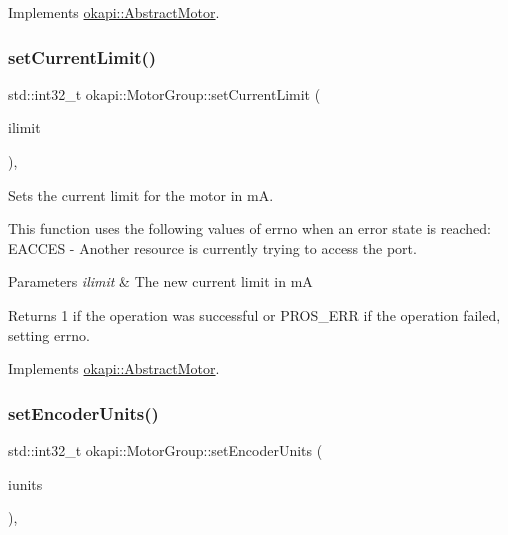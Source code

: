 Implements \mbox{\hyperlink{classokapi_1_1AbstractMotor_af7bb7d0d895c89d6b193f500587a818b}{okapi\+::\+Abstract\+Motor}}.

\mbox{\label{classokapi_1_1MotorGroup_a6d70691246bb8ba18d17f97b40a7f3f9}} 
\subsubsection{\texorpdfstring{setCurrentLimit()}{setCurrentLimit()}}
{\footnotesize\ttfamily std\+::int32\+\_\+t okapi\+::\+Motor\+Group\+::set\+Current\+Limit (\begin{DoxyParamCaption}\item[{std\+::int32\+\_\+t}]{ilimit }\end{DoxyParamCaption})\hspace{0.3cm}{\ttfamily [override]}, {\ttfamily [virtual]}}

Sets the current limit for the motor in mA.

This function uses the following values of errno when an error state is reached\+: E\+A\+C\+C\+ES -\/ Another resource is currently trying to access the port.


\begin{DoxyParams}{Parameters}
{\em ilimit} & The new current limit in mA \\
\hline
\end{DoxyParams}
\begin{DoxyReturn}{Returns}
1 if the operation was successful or {\ttfamily P\+R\+O\+S\+\_\+\+E\+RR} if the operation failed, setting errno. 
\end{DoxyReturn}


Implements \mbox{\hyperlink{classokapi_1_1AbstractMotor_aec97c81f3d6604363ebc8ceaf425fe39}{okapi\+::\+Abstract\+Motor}}.

\mbox{\label{classokapi_1_1MotorGroup_ad08cc59d805811a81ce5d25580ad0ce0}} 
\subsubsection{\texorpdfstring{setEncoderUnits()}{setEncoderUnits()}}
{\footnotesize\ttfamily std\+::int32\+\_\+t okapi\+::\+Motor\+Group\+::set\+Encoder\+Units (\begin{DoxyParamCaption}\item[{\mbox{\hyperlink{classokapi_1_1AbstractMotor_ae811cd825099f2defadeb1b7f7e7764c}{Abstract\+Motor\+::encoder\+Units}}}]{iunits }\end{DoxyParamCaption})\hspace{0.3cm}{\ttfamily [override]}, {\ttfamily [virtual]}}

